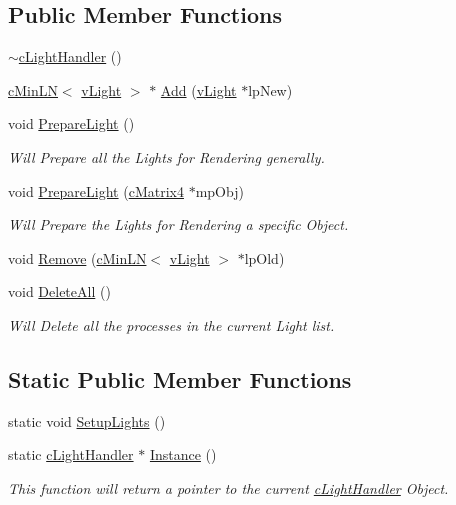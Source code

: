 \subsection*{Public Member Functions}
\begin{DoxyCompactItemize}
\item 
\hyperlink{classc_light_handler_a17ed4af735943e71d486ebbe15b70eb8}{$\sim$cLightHandler} ()
\item 
\hyperlink{classc_min_l_n}{cMinLN}$<$ \hyperlink{classv_light}{vLight} $>$ $\ast$ \hyperlink{classc_light_handler_ad11b0b020fe2dbe57e0cdff69e4ccdbe}{Add} (\hyperlink{classv_light}{vLight} $\ast$lpNew)
\item 
void \hyperlink{classc_light_handler_a6961b97a431244a4494e36fe468b67fb}{PrepareLight} ()
\begin{DoxyCompactList}\small\item\em Will Prepare all the Lights for Rendering generally. \item\end{DoxyCompactList}\item 
void \hyperlink{classc_light_handler_af496ab1e05b26dcc1ae5da53a84da271}{PrepareLight} (\hyperlink{classc_matrix4}{cMatrix4} $\ast$mpObj)
\begin{DoxyCompactList}\small\item\em Will Prepare the Lights for Rendering a specific Object. \item\end{DoxyCompactList}\item 
void \hyperlink{classc_light_handler_a8c89de26ed57dca05e0daa5dbf089f8f}{Remove} (\hyperlink{classc_min_l_n}{cMinLN}$<$ \hyperlink{classv_light}{vLight} $>$ $\ast$lpOld)
\item 
void \hyperlink{classc_light_handler_aa3fa6f26deaa89361a703e94224bf641}{DeleteAll} ()
\begin{DoxyCompactList}\small\item\em Will Delete all the processes in the current Light list. \item\end{DoxyCompactList}\end{DoxyCompactItemize}
\subsection*{Static Public Member Functions}
\begin{DoxyCompactItemize}
\item 
static void \hyperlink{classc_light_handler_ac1357d0e2b0a15413a5a6b16e1b3abab}{SetupLights} ()
\item 
static \hyperlink{classc_light_handler}{cLightHandler} $\ast$ \hyperlink{classc_light_handler_ac0473959c255734fa3937f3d09e718a0}{Instance} ()
\begin{DoxyCompactList}\small\item\em This function will return a pointer to the current \hyperlink{classc_light_handler}{cLightHandler} Object. \item\end{DoxyCompactList}\end{DoxyCompactItemize}


